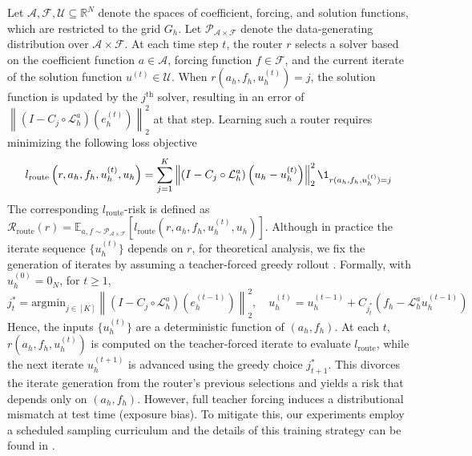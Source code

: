 \documentclass{article} %
\begin{document}
Let $\mathcal{A}, \mathcal{F}, \mathcal{U} \subseteq \mathbb{R}^N$ denote the spaces of coefficient, forcing, and solution functions, which are restricted to the grid $G_h$. Let $\mathcal{P}_{\mathcal{A} \times \mathcal{F}}$ denote the data-generating distribution over $\mathcal{A} \times \mathcal{F}$. At each time step $t$, the router $r$ selects a solver based on the coefficient function $a \in \mathcal{A}$, forcing function $f \in \mathcal{F}$, and the current iterate of the solution function $u^{(t)} \in \mathcal{U}$. 
When $r(a_h, f_h, u^{(t)}_h) = j$, the solution function is updated by the $j^{\text{th}}$ solver, resulting in an error of $\left\|\left( I - C_{j} \circ  \mathcal{L}_{h}^a\right)\left(e^{(t)}_h\right)\right\|^2_2$ at that step. Learning such a router requires minimizing the following loss objective
\begin{equation} \label{eq:routerloss}
    l_{\text{route}}\left(r, a_h, f_h, u^{(t)}_h, u_h\right) = \sum_{j = 1}^K \left\|\left( I - C_{j} \circ \mathcal{L}_{h}^a\right)\left(u_h - u^{(t)}_h\right)\right\|^2_2\1_{r(a_h, f_h, u^{(t)}_h) = j}
\end{equation}
The corresponding $l_{\text{route}}$-risk is defined as $\mathcal{R}_{\text{route}}\left(r\right) = \mathbb{E}_{a, f \sim \mathcal{P}_{\mathcal{A} \times \mathcal{F}}}\left[l_{\text{route}}\left(r, a_h, f_h, u^{(t)}_h, u_h\right)\right]$.  Although in practice the iterate sequence $\{u^{(t)}_h\}$ depends on $r$, for theoretical analysis, we fix the generation of iterates by assuming a teacher-forced greedy rollout \citep{williams1989learning,lamb2016professor}. Formally, with $u_h^{(0)} = 0_N$, for $t \geq 1$, 
$$j^*_t = \text{argmin}_{j \in [K]} \left\|\left( I - C_{j} \circ \mathcal{L}_{h}^a\right)\left(e^{(t - 1)}_h\right)\right\|^2_2, \quad u^{(t)}_h = u^{(t - 1)}_h + C_{j^{*}_t}\left(f_h - \mathcal{L}_h^a u_h^{(t - 1)}\right)$$
Hence, the inputs $\{u^{(t)}_h\}$ are a deterministic function of $(a_h, f_h)$. At each $t$, $r(a_h, f_h, u^{(t)}_h)$ is computed on the teacher-forced iterate to evaluate $l_{\text{route}}$, while the next iterate $u^{(t + 1)}_h$ is advanced using the greedy choice $j^*_{t + 1}$. This divorces the iterate generation from the router's previous selections and yields a risk that depends only on $(a_h, f_h)$. However, full teacher forcing induces a distributional mismatch at test time (exposure bias). To mitigate this, our experiments employ a scheduled sampling curriculum \citep{bengio2015scheduled} and the details of this training strategy can be found in .
\end{document}
